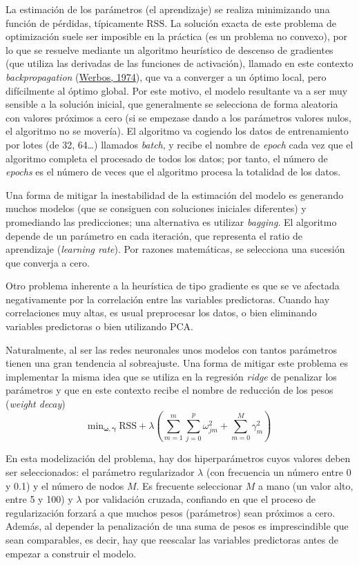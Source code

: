 \documentclass[
]{book}
\theoremstyle{break}
\theoremstyle{nonumberplain}
\begin{document}
La estimación de los parámetros (el aprendizaje) se realiza minimizando una función de pérdidas, típicamente \(\mbox{RSS}\).
La solución exacta de este problema de optimización suele ser imposible en la práctica (es un problema no convexo), por lo que se resuelve mediante un algoritmo heurístico de descenso de gradientes (que utiliza las derivadas de las funciones de activación), llamado en este contexto \emph{backpropagation} (\protect\hyperlink{ref-werbos1974new}{Werbos, 1974}), que va a converger a un óptimo local, pero difícilmente al óptimo global.
Por este motivo, el modelo resultante va a ser muy sensible a la solución inicial, que generalmente se selecciona de forma aleatoria con valores próximos a cero (si se empezase dando a los parámetros valores nulos, el algoritmo no se movería).
El algoritmo va cogiendo los datos de entrenamiento por lotes (de 32, 64\ldots) llamados \emph{batch}, y recibe el nombre de \emph{epoch} cada vez que el algoritmo completa el procesado de todos los datos; por tanto, el número de \emph{epochs} es el número de veces que el algoritmo procesa la totalidad de los datos.

Una forma de mitigar la inestabilidad de la estimación del modelo es generando muchos modelos (que se consiguen con soluciones iniciales diferentes) y promediando las predicciones; una alternativa es utilizar \emph{bagging}.
El algoritmo depende de un parámetro en cada iteración, que representa el ratio de aprendizaje (\emph{learning rate}).
Por razones matemáticas, se selecciona una sucesión que converja a cero.

Otro problema inherente a la heurística de tipo gradiente es que se ve afectada negativamente por la correlación entre las variables predictoras.
Cuando hay correlaciones muy altas, es usual preprocesar los datos, o bien eliminando variables predictoras o bien utilizando PCA.

Naturalmente, al ser las redes neuronales unos modelos con tantos parámetros tienen una gran tendencia al sobreajuste.
Una forma de mitigar este problema es implementar la misma idea que se utiliza en la regresión \emph{ridge} de penalizar los parámetros y que en este contexto recibe el nombre de reducción de los pesos (\emph{weight decay})
\[\mbox{min}_{\boldsymbol{\omega}, \boldsymbol{\gamma}}\ \mbox{RSS} + 
\lambda \left(\sum_{m=1}^m \sum_{j=0}^p \omega_{jm}^2 + \sum_{m=0}^M \gamma_m^2
\right)\]

En esta modelización del problema, hay dos hiperparámetros cuyos valores deben ser seleccionados: el parámetro regularizador \(\lambda\) (con frecuencia un número entre 0 y 0.1) y el número de nodos \(M\).
Es frecuente seleccionar \(M\) a mano (un valor alto, entre 5 y 100) y \(\lambda\) por validación cruzada, confiando en que el proceso de regularización forzará a que muchos pesos (parámetros) sean próximos a cero.
Además, al depender la penalización de una suma de pesos es imprescindible que sean comparables, es decir, hay que reescalar las variables predictoras antes de empezar a construir el modelo.
\end{document}
